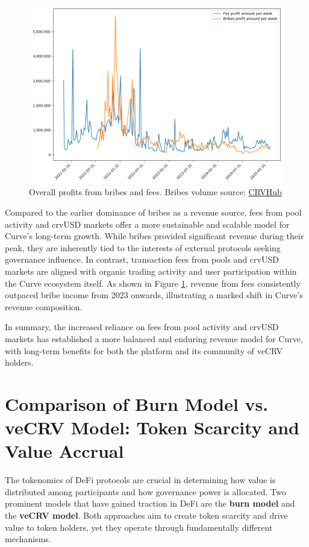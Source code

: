 \documentclass[notitlepage]{revtex4-2}
\begin{document}
\begin{figure}[ht]
    \centering
    \includegraphics[width=\linewidth]{images/CRV_profits}
    \caption{Overall profits from bribes and fees. Bribes volume source: \href{https://crvhub.com}{CRVHub}}
    \label{fig:profits}
\end{figure}

Compared to the earlier dominance of bribes as a revenue source, fees from pool activity and crvUSD markets offer a
more sustainable and scalable model for Curve’s long-term growth. While bribes provided significant revenue during
their peak, they are inherently tied to the interests of external protocols seeking governance influence. In contrast,
transaction fees from pools and crvUSD markets are aligned with organic trading activity and user participation within
the Curve ecosystem itself. As shown in Figure \ref{fig:profits}, revenue from fees consistently outpaced bribe income
from 2023 onwards, illustrating a marked shift in Curve’s revenue composition.

In summary, the increased reliance on fees from pool activity and crvUSD markets has established a more balanced and
enduring revenue model for Curve, with long-term benefits for both the platform and its community of veCRV holders.

\section{Comparison of Burn Model vs. veCRV Model: Token Scarcity and Value Accrual}

The tokenomics of DeFi protocols are crucial in determining how value is distributed among participants and how
governance power is allocated. Two prominent models that have gained traction in DeFi are the \textbf{burn model} and
the \textbf{veCRV model}. Both approaches aim to create token scarcity and drive value to token holders, yet they
operate through fundamentally different mechanisms.
\end{document}
